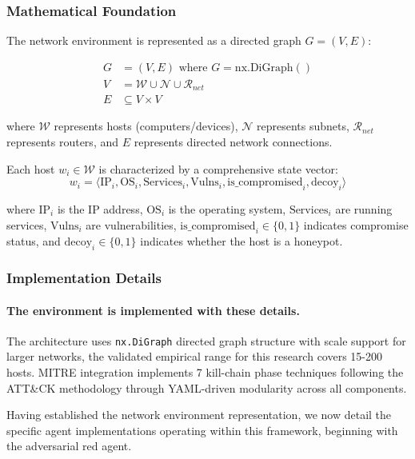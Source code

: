 \documentclass[12pt,oneside]{article}
\begin{document}
\subsubsection{Mathematical Foundation}
The network environment is represented as a directed graph $G = (V, E)$:

\begin{align}
G &= (V, E) \text{ where } G = \text{nx.DiGraph}() \\
V &= \mathcal{W} \cup \mathcal{N} \cup \mathcal{R}_{net} \\
E &\subseteq V \times V
\end{align}

where $\mathcal{W}$ represents hosts (computers/devices), $\mathcal{N}$ represents subnets, $\mathcal{R}_{net}$ represents routers, and $E$ represents directed network connections.

Each host $w_i \in \mathcal{W}$ is characterized by a comprehensive state vector:
\begin{equation}
w_i = \langle \text{IP}_i, \text{OS}_i, \text{Services}_i, \text{Vulns}_i, \text{is\_compromised}_i, \text{decoy}_i \rangle
\end{equation}

where $\text{IP}_i$ is the IP address, $\text{OS}_i$ is the operating system, $\text{Services}_i$ are running services, $\text{Vulns}_i$ are vulnerabilities, $\text{is\_compromised}_i \in \{0,1\}$ indicates compromise status, and $\text{decoy}_i \in \{0,1\}$ indicates whether the host is a honeypot.

\subsubsection{Implementation Details}
\paragraph{The environment is implemented with these details.}The architecture uses \texttt{nx.DiGraph} directed graph structure with scale support for larger networks, the validated empirical range for this research covers 15-200 hosts. MITRE integration implements 7 kill-chain phase techniques following the ATT\&CK methodology through YAML-driven modularity across all components.

Having established the network environment representation, we now detail the specific agent implementations operating within this framework, beginning with the adversarial red agent.
\end{document}
